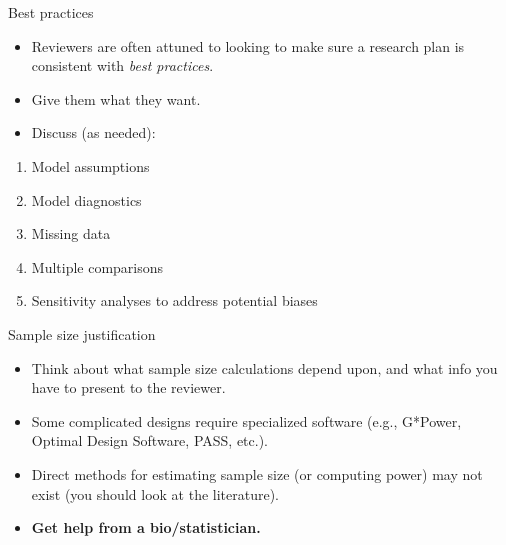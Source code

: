 \documentclass[ignorenonframetext,]{beamer}
\providecommand{\tightlist}{%
  \setlength{\itemsep}{0pt}\setlength{\parskip}{0pt}}
\begin{document}
\begin{frame}{Best practices}
\protect\hypertarget{best-practices}{}

\begin{itemize}
\item
  Reviewers are often attuned to looking to make sure a research plan is
  consistent with \emph{best practices}.
\item
  Give them what they want.
\item
  Discuss (as needed):
\end{itemize}

\begin{enumerate}
\tightlist
\item
  Model assumptions
\item
  Model diagnostics
\item
  Missing data
\item
  Multiple comparisons
\item
  Sensitivity analyses to address potential biases
\end{enumerate}

\end{frame}

\begin{frame}{Sample size justification}
\protect\hypertarget{sample-size-justification}{}

\begin{itemize}
\item
  Think about what sample size calculations depend upon, and what info
  you have to present to the reviewer.
\item
  Some complicated designs require specialized software (e.g., G*Power,
  Optimal Design Software, PASS, etc.).
\item
  Direct methods for estimating sample size (or computing power) may not
  exist (you should look at the literature).
\item
  \textbf{Get help from a bio/statistician.}
\end{itemize}

\end{frame}

\end{document}
